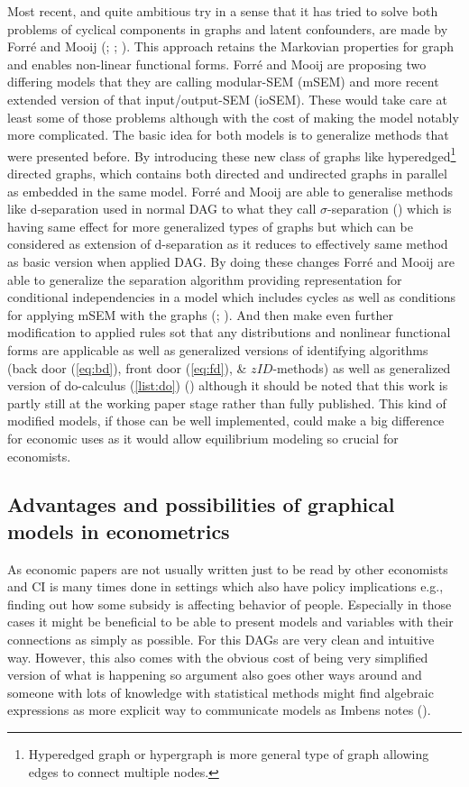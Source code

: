 \documentclass[main=english,12pt,a4paper,pdftex,econ,utf8]{aaltothesis}
\begin{document}
Most recent, and quite ambitious try in a sense that it has tried to solve both problems of cyclical components in graphs and latent confounders, are made by Forré and Mooij (\cite{Forre2017}; \cite{Forre2018}; \cite{Forre2019}). This approach retains the Markovian properties for graph and enables non-linear functional forms. Forré and Mooij are proposing two differing models that they are calling modular-SEM (mSEM) and more recent extended version of that input/output-SEM (ioSEM). These would take care at least some of those problems although with the cost of making the model notably more complicated. The basic idea for both models is to generalize methods that were presented before. By introducing these new class of graphs like hyperedged\footnote{Hyperedged graph or hypergraph is more general type of graph allowing edges to connect multiple nodes.} directed graphs, which contains both directed and undirected graphs in parallel as embedded in the same model. Forré and Mooij are able to generalise methods like d-separation used in normal DAG to what they call $\sigma$-separation (\cite{Forre2017}) which is having same effect for more generalized types of graphs but which can be considered as extension of d-separation as it reduces to effectively same method as basic version when applied DAG. By doing these changes Forré and Mooij are able to generalize the separation algorithm providing representation for conditional independencies in a model which includes cycles as well as conditions for applying mSEM with the graphs (\cite{Forre2017}; \cite{Forre2018}). And then make even further modification to applied rules sot that any distributions and nonlinear functional forms are applicable as well as generalized versions of identifying algorithms (back door (\ref{eq:bd}), front door (\ref{eq:fd}), \& $zID$-methods) as well as generalized version of do-calculus (\ref{list:do})  (\cite{Forre2019}) although it should be noted that this work is partly still at the working paper stage rather than fully published. This kind of modified models, if those can be well implemented, could make a big difference for economic uses as it would allow equilibrium modeling so crucial for economists.

\subsection{Advantages and possibilities of graphical models in econometrics} \label{subsection:benefits}

As economic papers are not usually written just to be read by other economists and CI is many times done in settings which also have policy implications e.g., finding out how some subsidy is affecting behavior of people. Especially in those cases it might be beneficial to be able to present models and variables with their connections as simply as possible. For this DAGs are very clean and intuitive way. However, this also comes with the obvious cost of being very simplified version of what is happening so argument also goes other ways around and someone with lots of knowledge with statistical methods might find algebraic expressions as more explicit way to communicate models as Imbens notes (\cite{imbes2020}).
\end{document}
